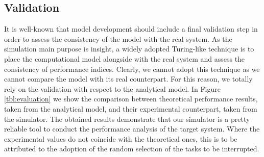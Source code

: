 \subsection{Validation}
It is well-known that model development should include a final validation step in order to assess the consistency of the model with the real system. 
%
As the simulation main purpose is insight, a widely adopted Turing-like technique is to place the computational model alongside with the real system and assess the consistency of performance indices.
%
Clearly, we cannot adopt this technique as we cannot compare the model with its real counterpart.
%
For this reason, we totally rely on the validation with respect to the analytical model. 
In Figure \ref{tbl:evaluation} we show the comparison between theoretical performance results, taken from the analytical model, and their experimental counterpart, taken from the simulator. 
The obtained results demonstrate that our simulator is a pretty reliable tool to conduct the performance analysis of the target system. Where the experimental values do not coincide with the theoretical ones, this is to be attributed to the adoption of the random selection of the tasks to be interrupted.